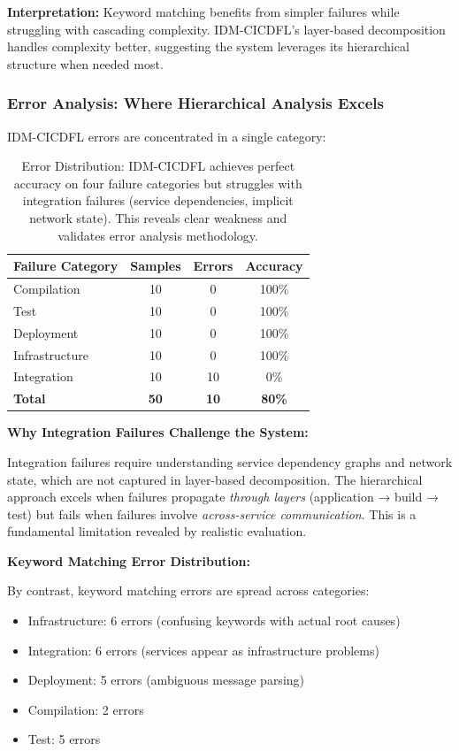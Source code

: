 \documentclass[11pt]{article}
\begin{document}
\textbf{Interpretation:} Keyword matching benefits from simpler failures while struggling with cascading complexity. IDM-CICDFL's layer-based decomposition handles complexity better, suggesting the system leverages its hierarchical structure when needed most.

\subsubsection{Error Analysis: Where Hierarchical Analysis Excels}

IDM-CICDFL errors are concentrated in a single category:

\begin{table}[h!]
\centering
\begin{tabular}{lccc}
\toprule
\textbf{Failure Category} & \textbf{Samples} & \textbf{Errors} & \textbf{Accuracy} \\
\midrule
Compilation & 10 & 0 & 100\% \\
Test & 10 & 0 & 100\% \\
Deployment & 10 & 0 & 100\% \\
Infrastructure & 10 & 0 & 100\% \\
Integration & 10 & 10 & 0\% \\
\midrule
\textbf{Total} & \textbf{50} & \textbf{10} & \textbf{80\%} \\
\bottomrule
\end{tabular}
\caption{Error Distribution: IDM-CICDFL achieves perfect accuracy on four failure categories but struggles with integration failures (service dependencies, implicit network state). This reveals clear weakness and validates error analysis methodology.}
\label{tab:error_distribution}
\end{table}

\textbf{Why Integration Failures Challenge the System:}

Integration failures require understanding service dependency graphs and network state, which are not captured in layer-based decomposition. The hierarchical approach excels when failures propagate \textit{through layers} (application → build → test) but fails when failures involve \textit{across-service communication}. This is a fundamental limitation revealed by realistic evaluation.

\textbf{Keyword Matching Error Distribution:}

By contrast, keyword matching errors are spread across categories:
\begin{itemize}
    \item Infrastructure: 6 errors (confusing keywords with actual root causes)
    \item Integration: 6 errors (services appear as infrastructure problems)
    \item Deployment: 5 errors (ambiguous message parsing)
    \item Compilation: 2 errors
    \item Test: 5 errors
\end{itemize}
\end{document}

